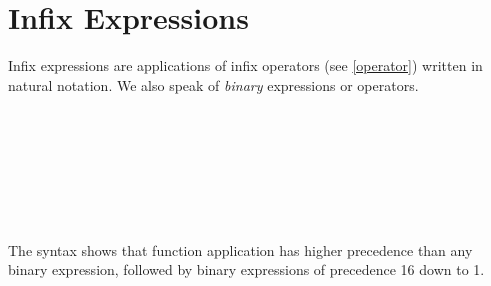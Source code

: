 \section{Infix Expressions} \label{binex}

Infix expressions are applications of infix operators (see \autoref{operator}) written in natural notation. We also speak of  \emph{binary} expressions or operators.

\begin{flushleft}
 \\
 \\
               
   \alt {}  
   \alt {}   
   \alt {}\\
    \\
   \\
  \\
\end{flushleft}

The syntax shows that function application has higher precedence than any binary expression, followed by binary expressions of precedence 16 down to 1.


